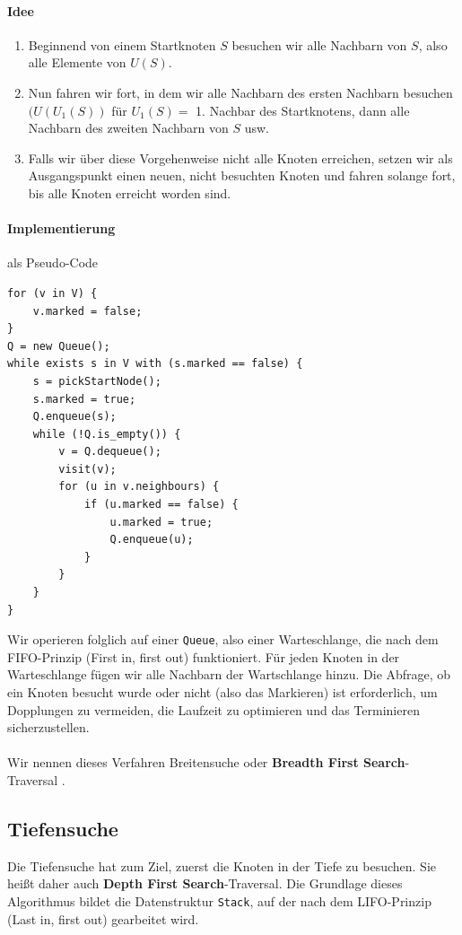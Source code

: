\documentclass[11pt,a4paper]{scrartcl}
\begin{document}
\paragraph{Idee}
\begin{enumerate}
\item Beginnend von einem Startknoten $S$ besuchen wir alle Nachbarn von $S$, also alle Elemente von $U(S)$.
\item Nun fahren wir fort, in dem wir alle Nachbarn des ersten Nachbarn besuchen $(U(U_{1}(S))$ für $U_{1}(S) = $ 1. Nachbar des Startknotens, dann alle Nachbarn des zweiten Nachbarn von $S$ usw.
\item Falls wir über diese Vorgehenweise nicht alle Knoten erreichen, setzen wir als Ausgangspunkt einen neuen, nicht besuchten Knoten und fahren solange fort, bis alle Knoten erreicht worden sind.
\end{enumerate}
\paragraph{Implementierung} als Pseudo-Code
\begin{lstlisting}
for (v in V) {
	v.marked = false;
}
Q = new Queue();
while exists s in V with (s.marked == false) {
	s = pickStartNode();
	s.marked = true;
	Q.enqueue(s);
	while (!Q.is_empty()) {
		v = Q.dequeue();
		visit(v);
		for (u in v.neighbours) {
			if (u.marked == false) {
				u.marked = true;
				Q.enqueue(u);			
			}		
		}	
	}
}
\end{lstlisting}
Wir operieren folglich auf einer \texttt{Queue}, also einer Warteschlange, die nach dem FIFO-Prinzip (First in, first out) funktioniert. Für jeden Knoten in der Warteschlange fügen wir alle Nachbarn der Wartschlange hinzu. Die Abfrage, ob ein Knoten besucht wurde oder nicht (also das Markieren) ist erforderlich, um Dopplungen zu vermeiden, die Laufzeit zu optimieren und das Terminieren sicherzustellen. \\\\
Wir nennen dieses Verfahren Breitensuche oder \textbf{Breadth First Search}-Traversal \parencite[][S. 574ff.]{Grundkurs}.
\subsection{Tiefensuche}
Die Tiefensuche hat zum Ziel, zuerst die Knoten in der Tiefe zu besuchen. Sie heißt daher auch \textbf{Depth First Search}-Traversal. Die Grundlage dieses Algorithmus bildet die Datenstruktur \texttt{Stack}, auf der nach dem LIFO-Prinzip (Last in, first out) gearbeitet wird.
\end{document}
